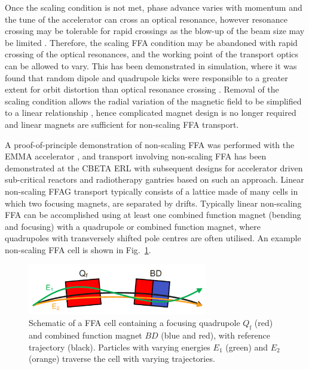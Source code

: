 \documentclass[../main.tex]{subfiles}
\begin{document}
Once the scaling condition is not met, phase advance varies with momentum and the tune of the accelerator can cross an optical resonance, however resonance crossing may be tolerable for rapid crossings as the blow-up of the beam size may be limited \cite{mills1997nsffa,johnstone1997nsffa}. Therefore, the scaling FFA condition may be abandoned with rapid crossing of the optical resonances, and the working point of the transport optics can be allowed to vary. This has been demonstrated in simulation, where it was found that random dipole and quadrupole kicks were responsible to a greater extent for orbit distortion than optical resonance crossing \cite{machida2007orbit}. Removal of the scaling condition allows the radial variation of the magnetic field to be simplified to a linear relationship \cite{johnstone1999fixed}, hence complicated magnet design is no longer required and linear magnets are sufficient for non-scaling FFA transport.

A proof-of-principle demonstration of non-scaling FFA was performed with the EMMA accelerator \cite{barlow2010emma,machida2012acceleration}, and transport involving non-scaling FFA has been demonstrated at the CBETA ERL \cite{hoffstaetter2017cbeta,bartnik2020cbeta} with subsequent designs for accelerator driven sub-critical reactors \cite{tygier2011high} and radiotherapy gantries \cite{trbojevic2009ffags,} based on such an approach. Linear non-scaling FFAG transport typically consists of a lattice made of many cells in which two focusing magnets, are separated by drifts. Typically linear non-scaling FFA can be accomplished using at least one combined function magnet (bending and focusing) with a quadrupole or combined function magnet, where quadrupoles with transversely shifted pole centres are often utilised. An example non-scaling FFA cell is shown in Fig.~\ref{fig:FFA_cell}.

\begin{figure}[!h]
\centering
\includegraphics[width=0.7\textwidth]{Figures/Energy_Recovery_Linac_Design/FFA_cell_fixed.pdf}
\caption{Schematic of a FFA cell containing a focusing quadrupole $Q_{\mathrm{f}}$ (red) and combined function magnet $BD$ (blue and red), with reference trajectory (black). Particles with varying energies $E_{1}$ (green) and $E_{2}$ (orange) traverse the cell with varying trajectories.}
\label{fig:FFA_cell}
\end{figure}
\end{document}
